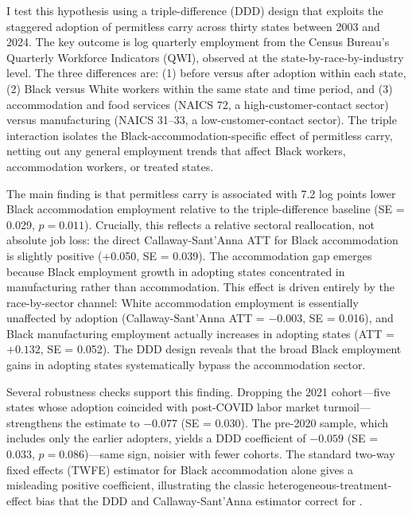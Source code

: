 \documentclass[12pt]{article}
\begin{document}
I test this hypothesis using a triple-difference (DDD) design that exploits the staggered adoption of permitless carry across thirty states between 2003 and 2024. The key outcome is log quarterly employment from the Census Bureau's Quarterly Workforce Indicators (QWI), observed at the state-by-race-by-industry level. The three differences are: (1) before versus after adoption within each state, (2) Black versus White workers within the same state and time period, and (3) accommodation and food services (NAICS 72, a high-customer-contact sector) versus manufacturing (NAICS 31--33, a low-customer-contact sector). The triple interaction isolates the Black-accommodation-specific effect of permitless carry, netting out any general employment trends that affect Black workers, accommodation workers, or treated states.

The main finding is that permitless carry is associated with 7.2 log points lower Black accommodation employment relative to the triple-difference baseline (SE = 0.029, $p = 0.011$). Crucially, this reflects a relative sectoral reallocation, not absolute job loss: the direct Callaway-Sant'Anna ATT for Black accommodation is slightly positive (+0.050, SE = 0.039). The accommodation gap emerges because Black employment growth in adopting states concentrated in manufacturing rather than accommodation. This effect is driven entirely by the race-by-sector channel: White accommodation employment is essentially unaffected by adoption (Callaway-Sant'Anna ATT = $-0.003$, SE = 0.016), and Black manufacturing employment actually increases in adopting states (ATT = $+0.132$, SE = 0.052). The DDD design reveals that the broad Black employment gains in adopting states systematically bypass the accommodation sector.

Several robustness checks support this finding. Dropping the 2021 cohort---five states whose adoption coincided with post-COVID labor market turmoil---strengthens the estimate to $-0.077$ (SE = 0.030). The pre-2020 sample, which includes only the earlier adopters, yields a DDD coefficient of $-0.059$ (SE = 0.033, $p = 0.086$)---same sign, noisier with fewer cohorts. The standard two-way fixed effects (TWFE) estimator for Black accommodation alone gives a misleading positive coefficient, illustrating the classic heterogeneous-treatment-effect bias that the DDD and Callaway-Sant'Anna estimator correct for \citep{callaway2021difference, goodman2021difference}.
\end{document}
